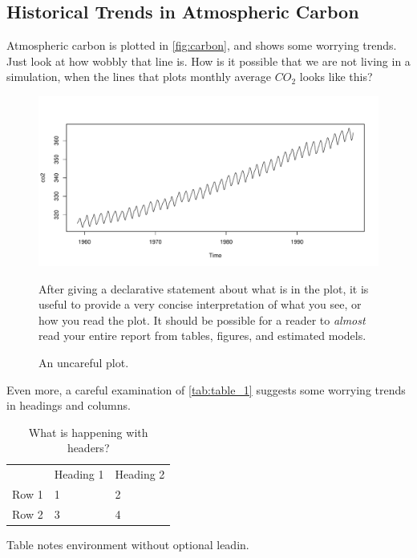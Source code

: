 \documentclass[AER]{AEA}
\begin{document}
\hypertarget{historical-trends-in-atmospheric-carbon}{%
\subsection{Historical Trends in Atmospheric
Carbon}\label{historical-trends-in-atmospheric-carbon}}

Atmospheric carbon is plotted in \autoref{fig:carbon}, and shows some
worrying trends. Just look at how wobbly that line is. How is it
possible that we are not living in a simulation, when the lines that
plots monthly average \(CO_{2}\) looks like this?

\begin{figure}
  \includegraphics[width=.8\linewidth]{./figures/plot_1.pdf}
  \caption{An uncareful plot.\label{fig:carbon}}
  \begin{figurenotes}
    After giving a declarative statement about what is in the plot, it is useful to provide a very concise interpretation of what you see, or how you read the plot. It should be possible for a reader to \textit{almost} read your entire report from tables, figures, and estimated models.
  \end{figurenotes}
\end{figure}

Even more, a careful examination of \autoref{tab:table_1} suggests some
worrying trends in headings and columns.

\begin{table}
  \caption{What is happening with headers?\label{tab:table_1}}
  \begin{tabular}{lll}
    \toprule 
    & Heading 1 & Heading 2 \\
    Row 1 & 1 & 2 \\
    Row 2 & 3 & 4 \\
    \bottomrule
  \end{tabular}
  \begin{tablenotes}
    Table notes environment without optional leadin.
  \end{tablenotes}
\end{table}
\end{document}
